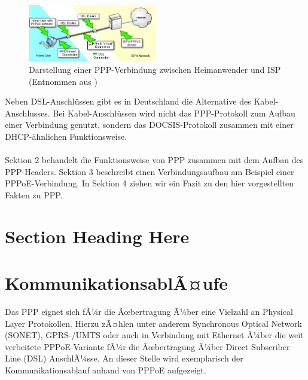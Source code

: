 \documentclass[journal]{IEEEtran}
\begin{document}
\begin{figure}[h!]
 \centering
  \includegraphics[width=0.5\textwidth]{img/PPP-Visualisierung}
 \caption{Darstellung einer PPP-Verbindung zwischen Heimanwender und ISP (Entnommen aus \cite{PPP-Bild})}
 \label{fig:PPP-Visualisierung}
\end{figure}
Neben DSL-Anschl\"ussen gibt es in Deutschland die Alternative des Kabel-Anschlusses. Bei Kabel-Anschl\"ussen wird nicht das PPP-Protokoll zum Aufbau einer Verbindung genutzt, sondern das DOCSIS-Protokoll zusammen mit einer DHCP-\"ahnlichen \cite{RFC3256} Funktionsweise. \\
\\
\newline
Sektion 2 behandelt die Funktionsweise von PPP zusammen mit dem Aufbau des PPP-Headers. Sektion 3 beschreibt einen Verbindungsaufbau am Beispiel einer PPPoE-Verbindung. In Sektion 4 ziehen wir ein Fazit zu den hier vorgestellten Fakten zu PPP.

\section{Section Heading Here}
\section{KommunikationsablÃ¤ufe}
Das PPP eignet sich fÃ¼r die Ãœbertragung Ã¼ber eine Vielzahl an Physical Layer Protokollen.
Hierzu zÃ¤hlen unter anderem  Synchronous Optical Network (SONET), GPRS-/UMTS oder auch
in Verbindung mit Ethernet Ã¼ber die weit verbeitete PPPoE-Variante fÃ¼r die Ãœbertragung
Ã¼ber Direct Subscriber Line (DSL) AnschlÃ¼sse\cite{IEEEhowto:kopka}.
An dieser Stelle wird exemplarisch der Kommunikationsablauf anhand von PPPoE aufgezeigt.
\end{document}

